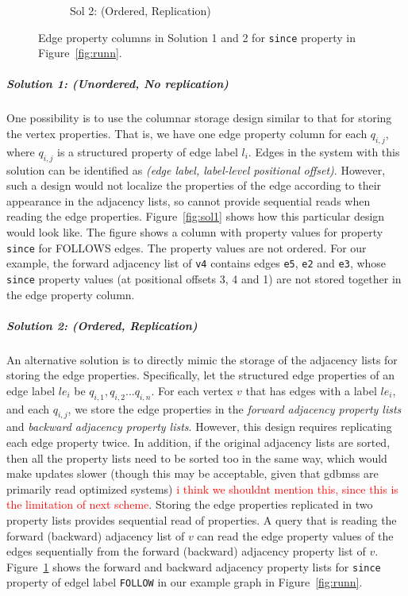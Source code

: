 \begin{figure}
\begin{subfigure}{0.55\textwidth}
		\captionsetup{justification=centering}
		\caption{Sol 2: (Ordered, Replication)}
		\label{fig:sol2}
	\end{subfigure}
	\captionsetup{justification=centering}
	\vspace{5pt}
	\caption{Edge property columns in Solution 1 and 2 for \texttt{since} property in Figure~\ref{fig:runn}.}
	\vspace{-10pt}
	\label{fig:sol1and2}
\end{figure}

\vspace{-12pt}
\subparagraph{Solution 1: (Unordered, No replication)}One possibility is to use the columnar storage design similar to that for storing the vertex properties. That is, we have one edge property column for each $q_{i,j}$, where $q_{i,j}$ is a structured property of edge label $l_i$. Edges in the system with this solution can be identified as \emph{(edge label, label-level positional offset)}. However, such a design would not localize the properties of the edge according to their appearance in the adjacency lists, so cannot provide sequential reads when reading the edge properties. Figure~\ref{fig:sol1} shows how this particular design would look like. The figure shows a column with property values for property \texttt{since} for FOLLOWS edges. The property values are not ordered. For our example, the forward adjacency list of \texttt{v4} contains edges \texttt{e5}, \texttt{e2} and \texttt{e3}, whose \texttt{since} property values (at positional offsets 3, 4 and 1) are not stored together in the edge property column. 

\vspace{-12pt}

\subparagraph{Solution 2: (Ordered, Replication)}An alternative solution is to directly mimic the storage of the adjacency lists for storing the edge properties. Specifically, let the structured edge properties of an edge label $le_i$ be $q_{i,1}, q_{i,2} ... q_{i,n}$. For each vertex $v$ that has edges with a label $le_i$, and each $q_{i,j}$, we store the edge properties in the \emph{forward adjacency property lists} and \emph{backward adjacency property lists}. However, this design requires replicating each edge property twice. In addition, if the original adjacency lists are sorted, then all the property lists need to be sorted too in the same way, which would make updates slower (though this may be acceptable, given that \gls{gdbms}s are primarily read optimized systems) \textcolor{red}{i think we shouldnt mention this, since this is the limitation of next scheme}. Storing the edge properties replicated in two property lists provides sequential read of properties. A query that is reading the forward (backward) adjacency list of $v$ can read the edge property values of the edges sequentially from the forward (backward) adjacency property list of $v$. Figure~\ref{fig:sol2} shows the forward and backward adjacency property lists for \texttt{since} property of edgel label \texttt{FOLLOW} in our example graph in Figure~\ref{fig:runn}.

